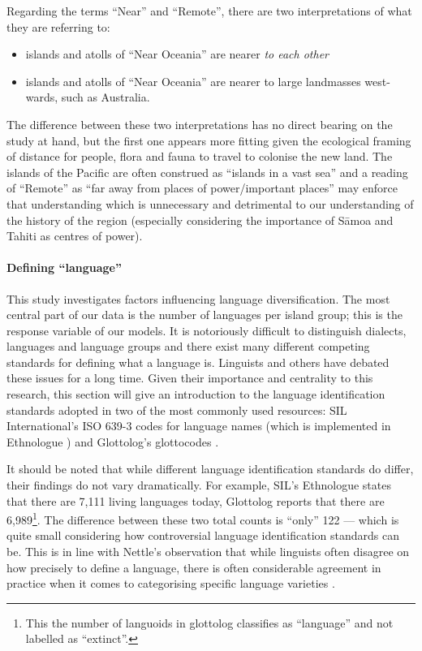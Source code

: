 \documentclass[unnumsec,webpdf,modern,medium]{oup-authoring-template}
\begin{document}
Regarding the terms ``Near'' and ``Remote'', there are two interpretations of what they are referring to:

\begin{itemize}
    \item islands and atolls of ``Near Oceania'' are nearer \emph{to each other} 
    \item islands and atolls of ``Near Oceania'' are nearer to large landmasses west-wards, such as Australia.
\end{itemize}

The difference between these two interpretations has no direct bearing on the study at hand, but the first one appears more fitting given the ecological framing of distance for people, flora and fauna to travel to colonise the new land. The islands of the Pacific are often construed as ``islands in a vast sea'' \citep{hauofa_1993} and a reading of ``Remote'' as ``far away from places of power/important places'' may enforce that understanding which is unnecessary and detrimental to our understanding of the history of the region (especially considering the importance of S\={a}moa and Tahiti as centres of power). 

\FloatBarrier
\paragraph{Defining ``language''}
\label{appendix_sec:language_class}
This study investigates factors influencing language diversification. The most central part of our data is the number of languages per island group; this is the response variable of our models. It is notoriously difficult to distinguish dialects, languages and language groups and there exist many different competing standards for defining what a language is. Linguists and others have debated these issues for a long time. Given their importance and centrality to this research, this section will give an introduction to the language identification standards adopted in two of the most commonly used resources: SIL International's ISO 639-3 codes for language names (which is implemented in Ethnologue \citep{ethnologue22}) and Glottolog's glottocodes \citet{glottolog3}.

It should be noted that while different language identification standards do differ, their findings do not vary dramatically. For example, SIL's Ethnologue states that there are 7,111 living languages today, Glottolog reports that there are 6,989\footnote{This the number of languoids in glottolog classifies as ``language'' and not labelled as ``extinct''.}. The difference between these two total counts is ``only'' 122 --- which is quite small considering how controversial language identification standards can be. This is in line with Nettle's observation that while linguists often disagree on how precisely to define a language, there is often considerable agreement in practice when it comes to categorising specific language varieties \citep[356]{NETTLE1998}.
\end{document}
